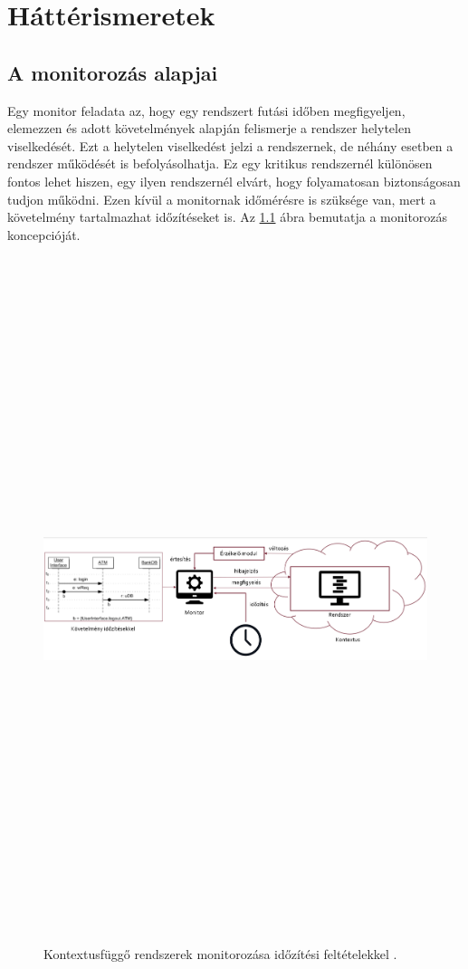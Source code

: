 \chapter{Háttérismeretek}\section{A monitorozás alapjai}

Egy monitor feladata az, hogy egy rendszert futási időben megfigyeljen, elemezzen és adott követelmények alapján felismerje a rendszer helytelen viselkedését.
Ezt a helytelen viselkedést jelzi a rendszernek, de néhány esetben a rendszer működését is befolyásolhatja.
Ez egy kritikus rendszernél különösen fontos lehet hiszen, egy ilyen rendszernél elvárt, hogy folyamatosan biztonságosan tudjon működni.
Ezen kívül a monitornak időmérésre is szüksége van, mert a követelmény tartalmazhat időzítéseket is.
Az \ref{introductory_figure} ábra bemutatja a monitorozás koncepcióját.

\begin{figure}[!ht]
    \includegraphics[width=150mm, height=20cm, keepaspectratio]{figures/introductory_figure.png}
    \caption{Kontextusfüggő rendszerek monitorozása időzítési feltételekkel \cite{Bakai}.}
    \label{introductory_figure}
\end{figure}

